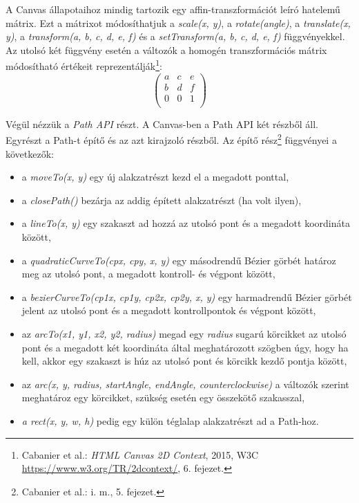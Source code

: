 \documentclass[12pt]{report}
\theoremstyle{definition}
\newcommand{\func}[1]{{\textsl{#1}}}
\begin{document}
A Canvas állapotaihoz mindig tartozik egy affin-transzformációt leíró hatelemű
mátrix. Ezt a mátrixot módosíthatjuk a \func{scale(x, y)}, a
\func{rotate(angle)}, a \func{translate(x, y)},  a \func{transform(a, b, c, d,
e, f)} és a \func{setTransform(a, b, c, d, e, f)} függvényekkel. Az utolsó két
függvény esetén a változók a homogén transzformációs mátrix módosítható
értékeit reprezentálják\footnote{Cabanier et al.: \emph{{HTML} Canvas {2D}
Context}, 2015, W3C\\ {\footnotesize\url{https://www.w3.org/TR/2dcontext/}},
6. fejezet.}: \[\begin{pmatrix}a & c & e \\ b & d & f \\ 0 & 0 & 1 \\
\end{pmatrix}\]

Végül nézzük a \emph{Path API} részt. A Canvas-ben a Path API két részből áll.
Egyrészt a Path-t építő és az azt kirajzoló részből. Az építő
rész\footnote{Cabanier et al.: i. m., 5. fejezet.} függvényei a következők:
\begin{itemize}
  \item a \func{moveTo(x, y)} egy új alakzatrészt kezd el a megadott ponttal,
  \item a \func{closePath()} bezárja az addig épített alakzatrészt (ha volt
  ilyen),
  \item a \func{lineTo(x, y)} egy szakaszt ad hozzá az utolsó pont és
  a megadott koordináta között,
  \item a \func{quadraticCurveTo(cpx, cpy, x, y)} egy másodrendű Bézier
  görbét határoz meg az utolsó pont, a megadott kontroll- és végpont között,
  \item a \func{bezierCurveTo(cp1x, cp1y, cp2x, cp2y, x, y)} egy harmadrendű
  Bézier görbét jelent az utolsó pont és a megadott kontrollpontok és végpont
  között,
  \item az \func{arcTo(x1, y1, x2, y2, radius)} megad egy \func{radius} sugarú
  körcikket az utolsó
  pont és a megadott két koordináta által meghatározott szögben úgy,
  hogy ha kell, akkor egy szakaszt is húz az utolsó pont és körcikk kezdő
  pontja között,
  \item az \func{arc(x, y, radius, startAngle, endAngle, counterclockwise)} a
  változók szerint meghatároz egy körcikket, szükség esetén egy összekötő
  szakasszal,
  \item \func{a rect(x, y, w, h)} pedig egy külön téglalap alakzatrészt ad a
  Path-hoz.
\end{itemize}
\end{document}
